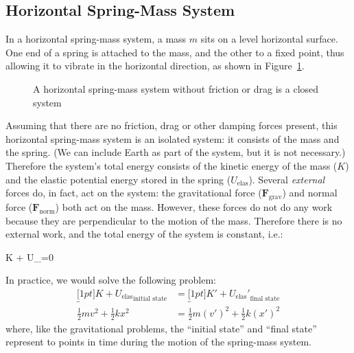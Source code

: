 \subsection{Horizontal Spring-Mass System}
In a horizontal spring-mass system, a mass $m$ sits on a level horizontal
surface. One end of a spring is attached to the mass, and the other to a fixed
point, thus allowing it to vibrate in the horizontal direction, as shown in
Figure~\ref{fig:hspring-mass}.
\begin{figure}[ht]
  \centering
  \caption{A horizontal spring-mass system without friction or drag is a
  closed system}
  \label{fig:hspring-mass}
\end{figure}
Assuming that there are no friction, drag or other damping forces present, this
horizontal spring-mass system is an isolated system: it consists of the mass and
the spring. (We can include Earth as part of the system, but it is not
necessary.) Therefore the system's total energy consists of the kinetic energy
of the mass ($K$) and the elastic potential energy stored in the spring
($U_\text{elas}$). Several \emph{external} forces do, in fact, act on the
system: the gravitational force ($\bm F_\text{grav}$) and normal force
($\bm F_\text{norm}$) both act on the mass. However, these forces do not do any
work because they are perpendicular to the motion of the mass. Therefore there
is no external work, and the total energy of the system is constant, i.e.:
\begin{important-equation}
  \Delta K + \Delta U_=0
  \quad{}
\end{important-equation}
In practice, we would solve the following problem:
\begin{align}
  \nonumber
  \underbracket[1pt]{K+U_\text{elas}}_\text{initial state} &=
  \underbracket[1pt]{K'+U_\text{elas}'}_\text{final state}\\
  \frac12mv^2+\frac12kx^2 &= \frac12m(v')^2+\frac12k(x')^2
\end{align}
where, like the gravitational problems, the ``initial state'' and ``final
state'' represent to points in time during the motion of the spring-mass system.

